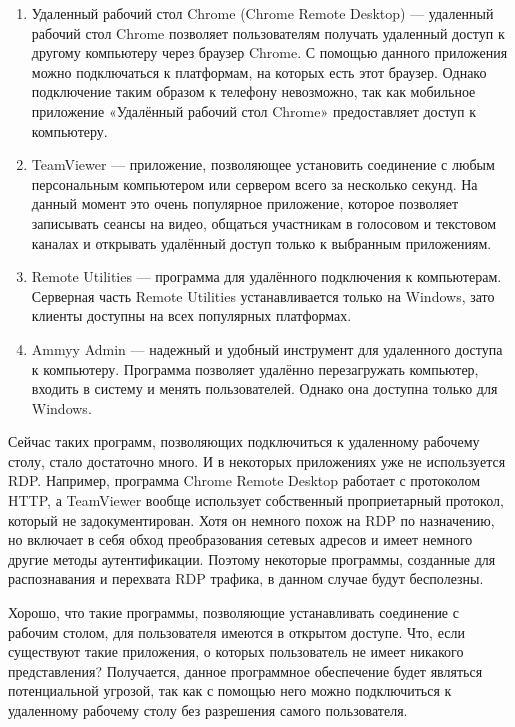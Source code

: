 \documentclass[bachelor, och, coursework]{SCWorks}
\begin{document}
  \begin{enumerate}
    \item Удаленный рабочий стол Chrome (Chrome Remote Desktop) --- удаленный рабочий стол Chrome позволяет пользователям получать удаленный
    доступ к другому компьютеру через браузер Chrome. С помощью данного приложения можно подключаться к платформам, на которых есть этот браузер.
    Однако подключение таким образом к телефону невозможно, так как мобильное приложение «Удалённый рабочий стол Chrome» предоставляет доступ к компьютеру.
    \item TeamViewer --- приложение, позволяющее установить соединение с любым персональным компьютером или сервером всего за несколько секунд. На данный
    момент это очень популярное приложение, которое позволяет записывать сеансы на видео, общаться участникам в голосовом и текстовом каналах и открывать
    удалённый доступ только к выбранным приложениям.
    \item Remote Utilities --- программа для удалённого подключения к компьютерам. Серверная часть Remote Utilities устанавливается только на Windows,
    зато клиенты доступны на всех популярных платформах.
    \item Ammyy Admin --- надежный и удобный инструмент для удаленного доступа к компьютеру. Программа позволяет удалённо перезагружать компьютер,
    входить в систему и менять пользователей. Однако она доступна только для Windows.
  \end{enumerate}

  Сейчас таких программ, позволяющих подключиться к удаленному рабочему столу, стало достаточно много. И в некоторых приложениях уже не используется RDP.
  Например, программа Chrome Remote Desktop работает с протоколом HTTP, а TeamViewer вообще использует собственный проприетарный протокол, который не
  задокументирован. Хотя он немного похож на RDP по назначению, но включает в себя обход преобразования сетевых адресов и имеет немного другие методы аутентификации.
  Поэтому некоторые программы, созданные для распознавания и перехвата RDP трафика, в данном случае будут бесполезны.

  Хорошо, что такие программы, позволяющие устанавливать соединение с рабочим столом, для пользователя имеются в открытом доступе. Что, если существуют такие приложения,
  о которых пользователь не имеет никакого представления? Получается, данное программное обеспечение будет являться потенциальной угрозой, так как
  с помощью него можно подключиться к удаленному рабочему столу без разрешения самого пользователя.
  
\end{document}
